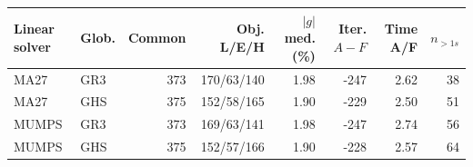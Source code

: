 \begin{tabular}{@{}llrrrrrr@{}}
\toprule
Linear solver & Glob. & Common & Obj. L/E/H & $|g|$ med. (\%) & Iter. $A-F$ & Time A/F & $n_{>1s}$\\
\midrule
MA27 & GR3 & 373 & 170/63/140 & 1.98 & -247 & 2.62 & 38\\
MA27 & GHS & 375 & 152/58/165 & 1.90 & -229 & 2.50 & 51\\
MUMPS & GR3 & 373 & 169/63/141 & 1.98 & -247 & 2.74 & 56\\
MUMPS & GHS & 375 & 152/57/166 & 1.90 & -228 & 2.57 & 64\\
\bottomrule
\end{tabular}
